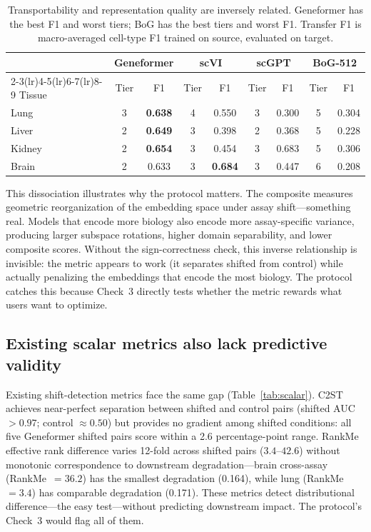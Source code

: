 \documentclass[9pt,lineno]{elife}
\begin{document}
\begin{table}[t]
\centering
\caption{Transportability and representation quality are inversely related. Geneformer has the best F1 and worst tiers; BoG has the best tiers and worst F1. Transfer F1 is macro-averaged cell-type F1 trained on source, evaluated on target.}
\label{tab:dissociation}
\small
\begin{tabular}{@{}lcccccccc@{}}
\toprule
 & \multicolumn{2}{c}{Geneformer} & \multicolumn{2}{c}{scVI} & \multicolumn{2}{c}{scGPT} & \multicolumn{2}{c}{BoG-512} \\
\cmidrule(lr){2-3}\cmidrule(lr){4-5}\cmidrule(lr){6-7}\cmidrule(lr){8-9}
Tissue & Tier & F1 & Tier & F1 & Tier & F1 & Tier & F1 \\
\midrule
Lung   & 3 & \textbf{0.638} & 4 & 0.550 & 3 & 0.300 & 5 & 0.304 \\
Liver  & 2 & \textbf{0.649} & 3 & 0.398 & 2 & 0.368 & 5 & 0.228 \\
Kidney & 2 & \textbf{0.654} & 3 & 0.454 & 3 & 0.683 & 5 & 0.306 \\
Brain  & 2 & 0.633 & 3 & \textbf{0.684} & 3 & 0.447 & 6 & 0.208 \\
\bottomrule
\end{tabular}
\end{table}

This dissociation illustrates why the protocol matters. The composite measures geometric reorganization of the embedding space under assay shift---something real. Models that encode more biology also encode more assay-specific variance, producing larger subspace rotations, higher domain separability, and lower composite scores. Without the sign-correctness check, this inverse relationship is invisible: the metric appears to work (it separates shifted from control) while actually penalizing the embeddings that encode the most biology. The protocol catches this because Check~3 directly tests whether the metric rewards what users want to optimize.

\subsection{Existing scalar metrics also lack predictive validity}

Existing shift-detection metrics face the same gap (Table~\ref{tab:scalar}). C2ST achieves near-perfect separation between shifted and control pairs (shifted AUC $> 0.97$; control $\approx 0.50$) but provides no gradient among shifted conditions: all five Geneformer shifted pairs score within a 2.6 percentage-point range. RankMe effective rank difference varies 12-fold across shifted pairs ($3.4$--$42.6$) without monotonic correspondence to downstream degradation---brain cross-assay (RankMe~$= 36.2$) has the smallest degradation (0.164), while lung (RankMe~$= 3.4$) has comparable degradation (0.171). These metrics detect distributional difference---the easy test---without predicting downstream impact. The protocol's Check~3 would flag all of them.
\end{document}
